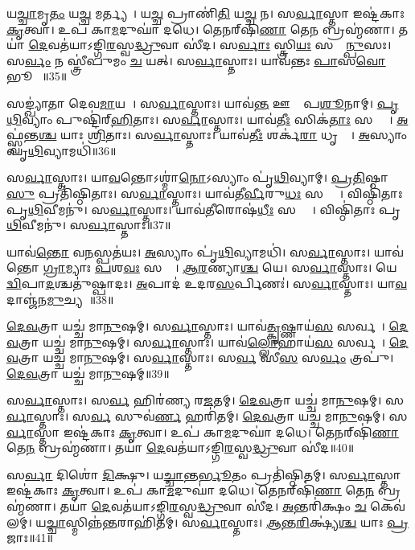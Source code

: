    𑌯\ul{𑌚𑍍𑌚𑌾}𑌮𑍃\ul{𑌤𑌂} 𑌯\ul{𑌚𑍍𑌚} 𑌮𑌰𑍍𑌤𑍍𑌯𑌮𑍍᳚।
   𑌯\ul{𑌚𑍍𑌚} 𑌪𑍍𑌰𑌾𑌣𑌿॑\ul{𑌤𑌿} 𑌯\ul{𑌚𑍍𑌚} 𑌨।
   𑌸\ul{𑌰𑍍𑌵𑌾}𑌸𑍍𑌤𑌾 𑌇𑌷𑍍𑌟॑𑌕𑌾𑌃 \ul{𑌕𑍃}𑌤𑍍𑌵𑌾।
   𑌉𑌪॑ 𑌕𑌾\ul{𑌮}𑌦𑍁𑌘𑌾॑ 𑌦𑌧𑍇।
   𑌤𑍇𑌨𑌰𑍍‌𑌷𑌿॑\ul{𑌣𑌾} 𑌤𑍇\ul{𑌨} 𑌬𑍍𑌰𑌹𑍍𑌮॑𑌣𑌾।
   𑌤𑌯𑌾॑ \ul{𑌦𑍇}𑌵𑌤॑𑌯𑌾𑌽𑌙𑍍𑌗𑌿\ul{𑌰}𑌸𑍍𑌵\ul{𑌦𑍍𑌧𑍍𑌰𑍁}𑌵𑌾 𑌸𑍀॑𑌦।
   𑌸\ul{𑌰𑍍𑌵𑌾𑌃} 𑌸𑍍𑌤𑍍𑌰𑌿\ul{𑌯𑌃} 𑌸𑌰𑍍𑌵𑌾᳚\ul{𑌨𑍍𑌪𑍁}\ul{}𑌸𑌃।
   𑌸\ul{𑌰𑍍𑌵𑌂} 𑌨 𑌸𑍍𑌤𑍍𑌰𑍀॑𑌪𑍁𑌮𑌂 \ul{𑌚} 𑌯𑌤𑍍।
   𑌸\ul{𑌰𑍍𑌵𑌾}𑌸𑍍𑌤𑌾𑌃।
   𑌯𑌾𑌵॑𑌨𑍍𑌤𑌃 \ul{𑌪𑌾}\ul{}𑌸\ul{𑌵𑍋} 𑌭𑍂𑌮𑍇𑌃᳚॥35॥

   𑌸𑌙𑍍𑌖𑍍𑌯𑌾॑𑌤𑌾 𑌦𑍇𑌵\ul{𑌮𑌾}𑌯𑌯𑌾᳚।
   𑌸\ul{𑌰𑍍𑌵𑌾}𑌸𑍍𑌤𑌾𑌃।
   𑌯𑌾𑌵॑\ul{𑌨𑍍𑌤} 𑌊𑌷𑌾𑌃᳚ 𑌪\ul{𑌶𑍂}𑌨𑌾𑌮𑍍।
   \ul{𑌪𑍃}\ul{𑌥𑌿}𑌵𑍍𑌯𑌾𑌂 𑌪𑍁𑌷𑍍𑌟𑌿॑𑌰𑍍‌\ul{𑌹𑌿}𑌤𑌾𑌃।
   𑌸\ul{𑌰𑍍𑌵𑌾}𑌸𑍍𑌤𑌾𑌃।
   𑌯𑌾𑌵॑\ul{𑌤𑍀𑌃} 𑌸𑌿𑌕॑\ul{𑌤𑌾𑌃} 𑌸𑌰𑍍𑌵𑌾𑌃᳚।
   \ul{𑌅}𑌫𑍍𑌸𑍍𑌵॑𑌨𑍍𑌤\ul{𑌶𑍍𑌚} 𑌯𑌾𑌃 \ul{𑌶𑍍𑌰𑌿}𑌤𑌾𑌃।
   𑌸\ul{𑌰𑍍𑌵𑌾}𑌸𑍍𑌤𑌾𑌃।
   𑌯𑌾𑌵॑\ul{𑌤𑍀𑌃} 𑌶𑌰𑍍𑌕॑\ul{𑌰𑌾} 𑌧𑍃𑌤𑍍𑌯𑍈᳚।
   \ul{𑌅}𑌸𑍍𑌯𑌾𑌂 𑌪𑍃॑\ul{𑌥𑌿}𑌵𑍍𑌯𑌾𑌮𑌧𑌿॑॥36॥	

   𑌸\ul{𑌰𑍍𑌵𑌾}𑌸𑍍𑌤𑌾𑌃।
   𑌯𑌾\ul{𑌵}𑌨𑍍𑌤𑍋𑌽𑌶𑍍𑌮𑌾॑\ul{𑌨𑍋}𑌽𑌸𑍍𑌯𑌾𑌂 𑌪𑍃॑\ul{𑌥𑌿}𑌵𑍍𑌯𑌾𑌮𑍍।
   \ul{𑌪𑍍𑌰}\ul{𑌤𑌿}𑌷𑍍𑌠𑌾\ul{𑌸𑍁} 𑌪𑍍𑌰𑌤𑌿॑𑌷𑍍𑌠𑌿𑌤𑌾𑌃।
   𑌸\ul{𑌰𑍍𑌵𑌾}𑌸𑍍𑌤𑌾𑌃।
   𑌯𑌾𑌵॑𑌤𑍀\ul{𑌰𑍍𑌵𑍀}𑌰𑍁\ul{𑌧𑌃} 𑌸𑌰𑍍𑌵𑌾𑌃᳚।
   𑌵𑌿𑌷𑍍𑌠𑌿॑𑌤𑌾𑌃 𑌪𑍃\ul{𑌥𑌿}𑌵𑍀𑌮𑌨𑍁॑।
   𑌸\ul{𑌰𑍍𑌵𑌾}𑌸𑍍𑌤𑌾𑌃।
   𑌯𑌾𑌵॑\ul{𑌤𑍀}𑌰𑍋𑌷॑\ul{𑌧𑍀𑌃} 𑌸𑌰𑍍𑌵𑌾𑌃᳚।
   𑌵𑌿𑌷𑍍𑌠𑌿॑𑌤𑌾𑌃 𑌪𑍃\ul{𑌥𑌿}𑌵𑍀𑌮𑌨𑍁॑।
   𑌸\ul{𑌰𑍍𑌵𑌾}𑌸𑍍𑌤𑌾𑌃॥37॥

   𑌯𑌾𑌵॑\ul{𑌨𑍍𑌤𑍋} 𑌵\ul{𑌨}𑌸𑍍𑌪𑌤॑𑌯𑌃।
   \ul{𑌅}𑌸𑍍𑌯𑌾𑌂 𑌪𑍃॑\ul{𑌥𑌿}𑌵𑍍𑌯𑌾𑌮𑌧𑌿॑।
   𑌸\ul{𑌰𑍍𑌵𑌾}𑌸𑍍𑌤𑌾𑌃।
   𑌯𑌾𑌵॑𑌨𑍍𑌤𑍋 \ul{𑌗𑍍𑌰𑌾}𑌮𑍍𑌯𑌾𑌃 \ul{𑌪}𑌶\ul{𑌵𑌃} 𑌸𑌰𑍍𑌵𑍇᳚।
   \ul{𑌆}\ul{𑌰}𑌣𑍍𑌯𑌾\ul{𑌶𑍍𑌚} 𑌯𑍇।
   𑌸\ul{𑌰𑍍𑌵𑌾}𑌸𑍍𑌤𑌾𑌃।
   𑌯𑍇 \ul{𑌦𑍍𑌵𑌿}𑌪𑌾\ul{𑌦}𑌶𑍍𑌚𑌤𑍁॑𑌷𑍍𑌪𑌾𑌦𑌃।
   \ul{𑌅}𑌪𑌾𑌦॑ 𑌉𑌦𑌰\ul{𑌸}𑌰𑍍𑌪𑌿𑌣𑌃॑।
   𑌸\ul{𑌰𑍍𑌵𑌾}𑌸𑍍𑌤𑌾𑌃।
   𑌯𑌾\ul{𑌵}𑌦𑌾𑌞𑍍𑌜॑𑌨\ul{𑌮𑍁}𑌚𑍍𑌯𑌤𑍇᳚॥38॥

   \ul{𑌦𑍇}\ul{𑌵}𑌤𑍍𑌰𑌾 𑌯𑌚𑍍𑌚॑ 𑌮𑌾\ul{𑌨𑍁}𑌷𑌮𑍍।
   𑌸\ul{𑌰𑍍𑌵𑌾}𑌸𑍍𑌤𑌾𑌃।
   𑌯𑌾𑌵॑\ul{𑌤𑍍𑌕𑍃}𑌷𑍍𑌣𑌾𑌯॑\ul{𑌸}\ul{} 𑌸𑌰𑍍𑌵𑌮𑍍᳚।
   \ul{𑌦𑍇}\ul{𑌵}𑌤𑍍𑌰𑌾 𑌯𑌚𑍍𑌚॑ 𑌮𑌾\ul{𑌨𑍁}𑌷𑌮𑍍।
   𑌸\ul{𑌰𑍍𑌵𑌾}𑌸𑍍𑌤𑌾𑌃।
   𑌯𑌾𑌵॑\ul{𑌲𑍍𑌲𑍋}𑌹𑌾𑌯॑\ul{𑌸}\ul{} 𑌸𑌰𑍍𑌵𑌮𑍍᳚।
   \ul{𑌦𑍇}\ul{𑌵}𑌤𑍍𑌰𑌾 𑌯𑌚𑍍𑌚॑ 𑌮𑌾\ul{𑌨𑍁}𑌷𑌮𑍍।
   𑌸\ul{𑌰𑍍𑌵𑌾}𑌸𑍍𑌤𑌾𑌃।
   𑌸\ul{𑌰𑍍𑌵}\ul{} 𑌸𑍀\ul{𑌸}\ul{} 𑌸\ul{𑌰𑍍𑌵𑌂} 𑌤𑍍𑌰𑌪𑍁॑।
   \ul{𑌦𑍇}\ul{𑌵}𑌤𑍍𑌰𑌾 𑌯𑌚𑍍𑌚॑ 𑌮𑌾\ul{𑌨𑍁}𑌷𑌮𑍍॥39॥

   𑌸\ul{𑌰𑍍𑌵𑌾}𑌸𑍍𑌤𑌾𑌃।
   𑌸\ul{𑌰𑍍𑌵}\ul{} 𑌹𑌿𑌰॑𑌣𑍍𑌯 𑌰\ul{𑌜}𑌤𑌮𑍍।
   \ul{𑌦𑍇}\ul{𑌵}𑌤𑍍𑌰𑌾 𑌯𑌚𑍍𑌚॑ 𑌮𑌾\ul{𑌨𑍁}𑌷𑌮𑍍।
   𑌸\ul{𑌰𑍍𑌵𑌾}𑌸𑍍𑌤𑌾𑌃।
   𑌸\ul{𑌰𑍍𑌵}\ul{} 𑌸𑍁𑌵॑\ul{𑌰𑍍𑌣}\ul{} 𑌹𑌰𑌿॑𑌤𑌮𑍍।
   \ul{𑌦𑍇}\ul{𑌵}𑌤𑍍𑌰𑌾 𑌯𑌚𑍍𑌚॑ 𑌮𑌾\ul{𑌨𑍁}𑌷𑌮𑍍।
   𑌸\ul{𑌰𑍍𑌵𑌾}𑌸𑍍𑌤𑌾 𑌇𑌷𑍍𑌟॑𑌕𑌾𑌃 \ul{𑌕𑍃}𑌤𑍍𑌵𑌾।
   𑌉𑌪॑ 𑌕𑌾\ul{𑌮}𑌦𑍁𑌘𑌾॑ 𑌦𑌧𑍇।
   𑌤𑍇𑌨𑌰𑍍‌𑌷𑌿॑\ul{𑌣𑌾} 𑌤𑍇\ul{𑌨} 𑌬𑍍𑌰𑌹𑍍𑌮॑𑌣𑌾।
   𑌤𑌯𑌾॑ \ul{𑌦𑍇}𑌵𑌤॑𑌯𑌾𑌽𑌙𑍍𑌗𑌿\ul{𑌰}𑌸𑍍𑌵\ul{𑌦𑍍𑌧𑍍𑌰𑍁}𑌵𑌾 𑌸𑍀॑𑌦॥40॥
   \anuvakamend
  
   𑌸\ul{𑌰𑍍𑌵𑌾} 𑌦𑌿𑌶𑍋॑ \ul{𑌦𑌿}𑌕𑍍𑌷𑍁।
   𑌯\ul{𑌚𑍍𑌚𑌾}𑌨𑍍𑌤\ul{𑌰𑍍𑌭𑍂}𑌤𑌂 𑌪𑍍𑌰𑌤𑌿॑𑌷𑍍𑌠𑌿𑌤𑌮𑍍।
   𑌸\ul{𑌰𑍍𑌵𑌾}𑌸𑍍𑌤𑌾 𑌇𑌷𑍍𑌟॑𑌕𑌾𑌃 \ul{𑌕𑍃}𑌤𑍍𑌵𑌾।
   𑌉𑌪॑ 𑌕𑌾\ul{𑌮}𑌦𑍁𑌘𑌾॑ 𑌦𑌧𑍇।
   𑌤𑍇𑌨𑌰𑍍‌𑌷𑌿॑\ul{𑌣𑌾} 𑌤𑍇\ul{𑌨} 𑌬𑍍𑌰𑌹𑍍𑌮॑𑌣𑌾।
   𑌤𑌯𑌾॑ \ul{𑌦𑍇}𑌵𑌤॑𑌯𑌾𑌽𑌙𑍍𑌗𑌿\ul{𑌰}𑌸𑍍𑌵\ul{𑌦𑍍𑌧𑍍𑌰𑍁}𑌵𑌾 𑌸𑍀॑𑌦।
   \ul{𑌅}𑌨𑍍𑌤𑌰𑌿॑𑌕𑍍𑌷𑌂 \ul{𑌚} 𑌕𑍇𑌵॑𑌲𑌮𑍍।
   𑌯\ul{𑌚𑍍𑌚𑌾}𑌸𑍍𑌮𑌿𑌨𑍍𑌨॑\ul{𑌨𑍍𑌤}𑌰𑌾𑌹𑌿॑𑌤𑌮𑍍।
   𑌸\ul{𑌰𑍍𑌵𑌾}𑌸𑍍𑌤𑌾𑌃।
   \ul{𑌆}\ul{𑌨𑍍𑌤}\ul{𑌰𑌿}𑌕𑍍𑌷𑍍𑌯॑\ul{𑌶𑍍𑌚} 𑌯𑌾𑌃 \ul{𑌪𑍍𑌰}𑌜𑌾𑌃॥41॥

